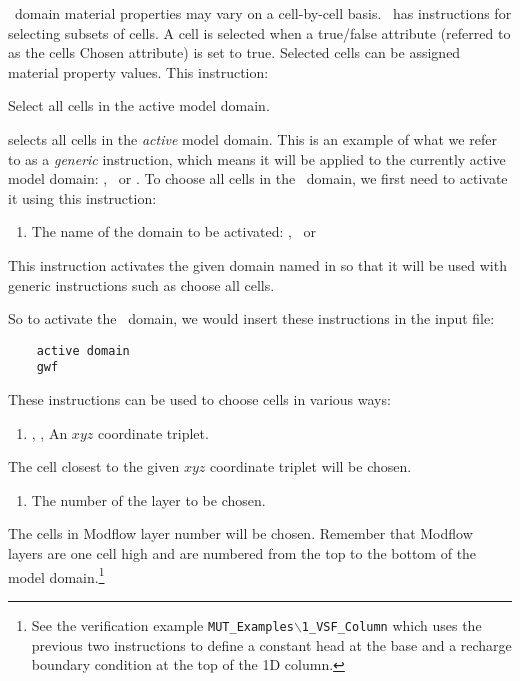 {\gwf\ domain material properties may vary on a cell-by-cell  basis.  \mut\ has instructions for selecting subsets of cells. A cell is selected when a true/false attribute (referred to as  the cells \textsf{Chosen} attribute) is set to true. Selected cells can be assigned material property values.  This instruction:

    {Select all cells in the active model domain.
     }

selects all cells in the {\em active} model domain.  This is an example of what we refer to as a {\em generic} instruction, which means it will be applied to the currently active model domain: \gwf, \swf\ or \cln.  To choose all cells in the \gwf\ domain, we first need to activate it using this instruction:

    {
        \squish
        \begin{enumerate}
        \item {}  The name of the domain to be activated: \gwf, \swf\ or \cln\
        \end{enumerate}
        This instruction activates the given domain named in   so that it will be used with generic instructions such as \textsf{choose all cells}.
    }

So to activate the \gwf\ domain, we would insert these instructions in the input file:
\begin{verbatim}
    active domain
    gwf
\end{verbatim}

These instructions can be used to choose cells in various ways\label{page:cellSelect}:

    {
        \squish
        \begin{enumerate}
        \item {}, ,   An $xyz$ coordinate triplet.
        \end{enumerate}
        The cell closest to the given $xyz$ coordinate triplet will be chosen.
    }

    {
        \squish
        \begin{enumerate}
        \item {}  The number of the layer to be chosen.
        \end{enumerate}
        The cells in Modflow layer number  will be chosen.  Remember that Modflow layers are one cell high and are numbered from the top to the bottom of the model domain.\footnote{ See the verification example \texttt{MUT\_Examples$\backslash$1\_VSF\_Column} which uses the previous two instructions to define a constant head at  the base  and a recharge boundary condition at the top of the 1D column.}
    }

}
